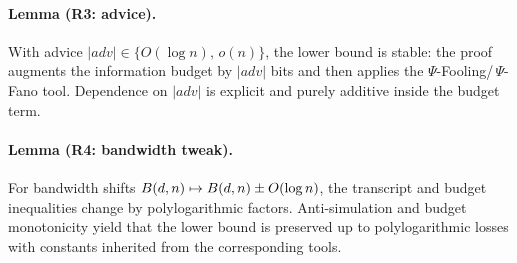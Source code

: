 \paragraph{Lemma (R3: advice).}\label{lem:R3-advice}
With advice $|adv| \in \{O(\log n),\, o(n)\}$, the lower bound is stable: the proof augments the information budget by $|adv|$ bits and then applies the $\Psi$-Fooling/\,$\Psi$-Fano tool. Dependence on $|adv|$ is explicit and purely additive inside the budget term.

\paragraph{Lemma (R4: bandwidth tweak).}\label{lem:R4-bandwidth-tweak}
For bandwidth shifts $\B(d,n) \mapsto \B(d,n) \pm O(\log n)$, the transcript and budget inequalities change by polylogarithmic factors. Anti-simulation and budget monotonicity yield that the lower bound is preserved up to polylogarithmic losses with constants inherited from the corresponding tools.
